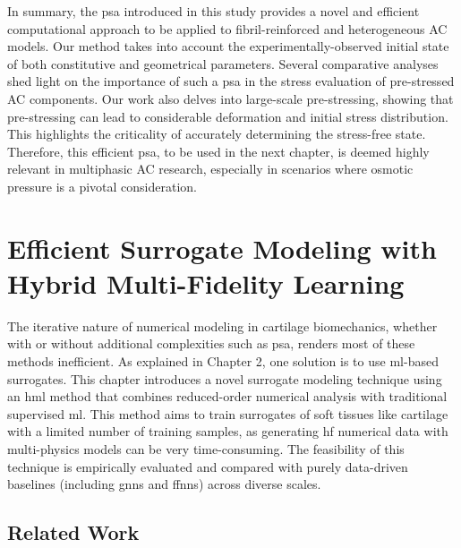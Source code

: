 \documentclass[12pt,a4paper]{report}
\begin{document}
In summary, the \ac{psa} introduced in this study provides a novel and efficient computational approach to be applied to fibril-reinforced and heterogeneous AC models. Our method takes into account the experimentally-observed initial state of both constitutive and geometrical parameters. Several comparative analyses shed light on the importance of such a \ac{psa} in the stress evaluation of pre-stressed AC components. Our work also delves into large-scale pre-stressing, showing that pre-stressing can lead to considerable deformation and initial stress distribution. This highlights the criticality of accurately determining the stress-free state. Therefore, this efficient \ac{psa}, to be used in the next chapter, is deemed highly relevant in multiphasic AC research, especially in scenarios where osmotic pressure is a pivotal consideration.


\chapter{Efficient Surrogate Modeling with Hybrid Multi-Fidelity Learning}

The iterative nature of numerical modeling in cartilage biomechanics, whether with or without additional complexities such as \ac{psa}, renders most of these methods inefficient. As explained in Chapter 2, one solution is to use \ac{ml}-based surrogates. This chapter introduces a novel surrogate modeling technique using an \ac{hml} method that combines reduced-order numerical analysis with traditional supervised \ac{ml}. This method aims to train surrogates of soft tissues like cartilage with a limited number of training samples, as generating \ac{hf} numerical data with multi-physics models can be very time-consuming. The feasibility of this technique is empirically evaluated and compared with purely data-driven baselines (including \acp{gnn} and \acp{ffnn}) across diverse scales.

\section{Related Work}
\end{document}
